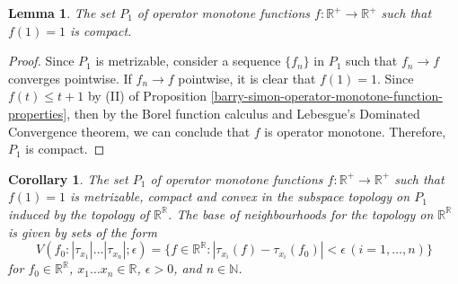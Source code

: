 \documentclass[12pt,a4paper]{amsart}
\newtheorem{corollary}[theorem]{Corollary}
\newtheorem{lemma}[theorem]{Lemma}
\theoremstyle{definition}
\newcommand{\myabs}[1]{ | #1 | }
\begin{document}
	
	\begin{lemma}
		The set $P_1$ of operator monotone functions $f: \mathbb{R}^{+} \rightarrow \mathbb{R}^{+}$ such that $f(1) = 1$ is compact.
	\end{lemma}
	\begin{proof}
		Since $P_1$ is metrizable, consider a sequence $\lbrace f_n \rbrace$ in $P_1$ such that $f_n \rightarrow f$ converges pointwise. If $f_n \rightarrow f$ pointwise, it is clear that $f(1)=1$. Since $f(t) \leq t + 1$ by (II) of Proposition \ref{barry-simon-operator-monotone-function-properties}, then by the Borel function calculus and Lebesgue's Dominated Convergence theorem, we can conclude that $f$ is operator monotone. Therefore, $P_1$ is compact. 
	\end{proof}
	
	
	\begin{corollary}\label{operator-monotone-functions-can-use-choquet-theory}
		The set $P_1$ of operator monotone functions $f: \mathbb{R}^{+} \rightarrow \mathbb{R}^{+}$ such that $f(1) = 1$ is metrizable, compact and convex in the subspace topology on $P_1$ induced by the topology of $\mathbb{R}^{\mathbb{R}}$. The base of neighbourhoods for the topology on $\mathbb{R}^{\mathbb{R}}$ is given by sets of the form
		\begin{equation*}
			V(f_0: \myabs{\tau_{x_1}} \ldots \myabs{\tau_{x_n}}; \epsilon) = \lbrace f \in \mathbb{R}^{\mathbb{R}} : \myabs{\tau_{x_i}(f) - \tau_{x_i}(f_0)} < \epsilon \, (i = 1, \ldots, n ) \rbrace 
		\end{equation*}
		for $f_0 \in \mathbb{R}^{\mathbb{R}}$, $x_1 \ldots x_n \in \mathbb{R}$, $\epsilon > 0$, and $n \in \mathbb{N}$.
	\end{corollary}
	
\end{document}
